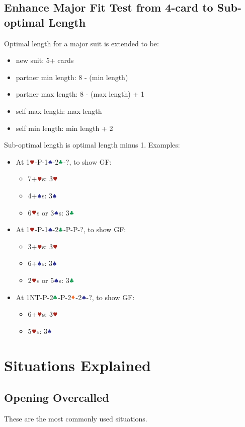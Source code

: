 \documentclass{article}
\newcommand*{\ccc}{\textcolor{ForestGreen}{\clubsuit}}
\newcommand*{\ddd}{\textcolor{Orange}{\vardiamondsuit}}
\newcommand*{\hhh}{\textcolor{Mahogany}{\varheartsuit}}
\newcommand*{\sss}{\textcolor{Blue}{\spadesuit}}
\begin{document}
\begin{multicols}{2}
\subsection{Enhance Major Fit Test from 4-card to Sub-optimal Length}
Optimal length for a major suit is extended to be:
\begin{itemize}
    \item new suit: 5+ cards
    \item partner min length: 8 - (min length)
    \item partner max length: 8 - (max length) + 1
    \item self max length: max length
    \item self min length: min length + 2
\end{itemize}
Sub-optimal length is optimal length minus 1. Examples:
\begin{itemize}
    \item At 1$\hhh$-P-1$\sss$-2$\ccc$-?, to show GF:
    \begin{itemize}
        \item 7+$\hhh$s: 3$\hhh$
        \item 4+$\sss$s: 3$\sss$
        \item 6$\hhh$s or 3$\sss$s: 3$\ccc$
    \end{itemize}
    \item At 1$\hhh$-P-1$\sss$-2$\ccc$-P-P-?, to show GF:
    \begin{itemize}
        \item 3+$\hhh$s: 3$\hhh$
        \item 6+$\sss$s: 3$\sss$
        \item 2$\hhh$s or 5$\sss$s: 3$\ccc$
    \end{itemize}
    \item At 1NT-P-2$\ccc$-P-2$\ddd$-2$\sss$-?, to show GF:
    \begin{itemize}
        \item 6+$\hhh$s: 3$\hhh$
        \item 5$\hhh$s: 3$\sss$
    \end{itemize}
\end{itemize}

\section{Situations Explained}
\subsection{Opening Overcalled}
These are the most commonly used situations.

\end{multicols}
\end{document}
